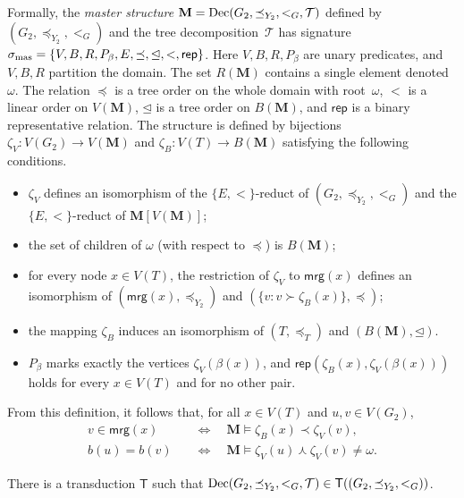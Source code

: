 \documentclass[1p,number,11pt]{elsarticle}
\theoremstyle{plain}
\newcommand{\mrg}{\mathsf{mrg}}
\DeclareMathOperator{\dec}{{\rm Dec}}
\begin{document}
Formally, the \emph{master structure} $\mathbf M=\dec(G_2,\preceq_{Y_2},<_{G},\mathcal T)$ defined by $(G_2,\preceq_{Y_2},<_{G})$ and the tree decomposition~$\mathcal T$ has signature
$
  \sigma_{\rm mas}=\{V,B,R,P_\beta,E,\preceq,\unlhd,<,\mathsf{rep}\}$.
Here $V,B,R,P_\beta$ are unary predicates, and $V,B,R$ partition the domain.
The set $R(\mathbf M)$ contains a single element denoted~$\omega$.
The relation $\preceq$ is a tree order on the whole domain with root~$\omega$, $<$ is a linear order on $V(\mathbf M)$, $\unlhd$ is a tree order on $B(\mathbf M)$, and $\mathsf{rep}$ is a binary representative relation.
The structure is defined by bijections $\zeta_V:V(G_2)\rightarrow V(\mathbf M)$ and $\zeta_B:V(T)\rightarrow B(\mathbf M)$ satisfying the following conditions.
    \begin{itemize}
        \item $\zeta_V$ defines an isomorphism of the ${\{E,<\}}$-reduct of 
    $(G_2,\preceq_{Y_2},<_{G})$ and the ${\{E,<\}}$-reduct of  $\mathbf M[V(\mathbf M)]$;
    \item the set of children of $\omega$ (with respect to $\preceq$) is $B(\mathbf M)$;
    \item for every node $x\in V(T)$, the restriction of $\zeta_V$ to $\mrg(x)$ defines an isomorphism of 
    $(\mrg(x),\preceq_{Y_2})$ and 
    $(\{v\colon v\succ \zeta_B(x)\},\preceq)$;
    \item the mapping $\zeta_B$ induces an isomorphism of $(T,\preceq_T)$ and
    $(B(\mathbf M),\unlhd)$.
    \item $P_\beta$ marks exactly the vertices $\zeta_V(\beta(x))$, and
    $\mathsf{rep}(\zeta_B(x),\zeta_V(\beta(x)))$ holds for every
    $x\in V(T)$ and for no other pair.
    \end{itemize}

From this definition, it follows that, for all $x\in V(T)$ and
$u,v\in V(G_2)$,
\begin{align*}
v\in\mrg(x)
&\quad\Longleftrightarrow\quad
\mathbf M\models \zeta_B(x)\prec \zeta_V(v),\\
b(u)=b(v)
&\quad\Longleftrightarrow\quad
\mathbf M\models
\zeta_V(u)\curlywedge\zeta_V(v)\neq\omega.
\end{align*}

\begin{lemma}
    There is a transduction $\mathsf T$ such that 
    $\dec(G_2,\preceq_{Y_2},<_{G},\mathcal T)\in\mathsf T((G_2,\preceq_{Y_2},<_{G}))$.
\end{lemma}
\end{document}
